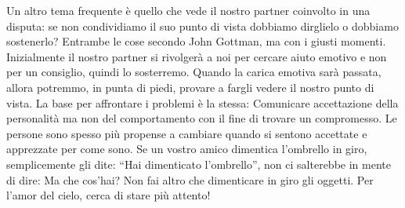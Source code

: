\documentclass[12pt]{book} %
\begin{document}
Un altro tema frequente è quello che vede il nostro partner coinvolto in una disputa: se non condividiamo il suo punto
di vista dobbiamo dirglielo o dobbiamo sostenerlo? Entrambe le cose secondo John Gottman, ma con i giusti momenti.
Inizialmente il nostro partner si rivolgerà a noi per cercare aiuto emotivo e non per un consiglio, quindi lo
sosterremo. Quando la carica emotiva sarà passata, allora potremmo, in punta di piedi, provare a fargli vedere il
nostro punto di vista. La base per affrontare i problemi è la stessa: Comunicare accettazione della personalità ma non del comportamento con il fine di trovare un compromesso.
Le persone sono spesso più propense a cambiare quando si sentono accettate e apprezzate per come sono. Se un vostro amico dimentica l'ombrello
in giro, semplicemente gli dite: “Hai dimenticato l'ombrello”, non ci salterebbe in mente di
dire: Ma che cos'hai? Non fai altro che dimenticare in giro gli oggetti. Per
l'amor del cielo, cerca di stare più attento! 
\end{document}
